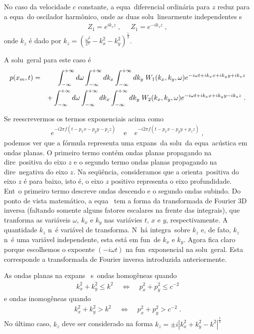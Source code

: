 No caso da velocidade $c$ constante, a equa\cao\ diferencial ordin\'aria
para $z$ reduz para a equa\cao\ do oscilador harm\^onico, onde as
duas solu\coes\ linearmente independentes s\ao\
\begin{eqnarray}
Z_1 = e^{ik_z z} \;, \;\;\;\;\; Z_1 = e^{-ik_z z} \; ,
\end{eqnarray}
onde $k_z$ \'e dado por $k_z = (\frac{\omega^2}{c^2} - k_x^2
- k_y^2)^{\frac{1}{2}}$.

A solu\cao\ geral para este caso \'e
\begin{eqnarray}\label{solcconst}
p(x_m,t) &=& \int_{-\infty}^{+\infty} d\omega \int_{-\infty}^{+\infty} dk_x \int_{-\infty}^{+\infty} dk_y \; W_1(k_x,k_y,\omega)
e^{-i\omega t + ik_x x + ik_y y + ik_z z} \nonumber \\
& & + \int_{-\infty}^{+\infty} d\omega \int_{-\infty}^{+\infty} dk_x \int_{-\infty}^{+\infty} dk_y \; W_2(k_x,k_y,\omega) 
e^{-i\omega t + ik_x x + ik_y y - ik_z z} \; .
\end{eqnarray}

Se reescrevermos os termos exponenciais acima como
\begin{eqnarray}
e^{-i2\pi f (t - p_x x - p_y y - p_z z)} \;\;\;\; \mbox{e} \;\;\;\;
e^{-i2\pi f (t - p_x x - p_y y + p_z z)} \; ,
\end{eqnarray} 
podemos ver que a f\'ormula  representa uma expans\ao\
da solu\cao\ da equa\cao\ ac\'ustica em ondas planas. O primeiro termo
cont\'em ondas planas propagando na dire\cao\ positiva do eixo $z$ e o
segundo termo ondas planas propagando na dire\cao\ negativa do
eixo $z$. Na seq\"u\^encia, consideramos que a orienta\cao\ positiva do
eixo $z$ \'e para baixo, isto \'e, o eixo $z$ positivo representa o 
eixo profundidade. Ent\ao\ o primeiro termo descreve ondas descendo e
o segundo ondas subindo. Do ponto de vista matem\'atico, a equa\cao\
 tem a forma da transformada de Fourier 3D inversa
(faltando somente alguns fatores escalares na frente das integrais), que
tranforma as vari\'aveis $\omega$, $k_x$ e $k_y$ nas vari\'avies $t$,
$x$ e $y$, respectivamente. A quantidade $k_z$ n\ao\ \'e vari\'avel de
transforma\cao. N\ao\ h\'a integra\cao\ sobre $k_z$ e, de fato, $k_z$
n\ao\ \'e uma vari\'avel independente, esta est\'a em fun\cao\ de
$k_x$ e $k_y$. Agora fica claro porque escolhemos o expoente
$(-i\omega t)$ na fun\cao\ exponencial na solu\cao\ geral. Esta
corresponde a transformada de Fourier inversa introduzida
anteriormente.

As ondas planas na expans\ao\ \refi{solcconst} s\ao\ ondas homog\^eneas
quando
\begin{eqnarray}
k_x^2 + k_y^2 \leq k^2 \;\;\;\; \Longleftrightarrow \;\;\;\;
p_x^2 + p_y^2 \leq c^{-2}
\end{eqnarray}
e ondas inomog\^eneas quando
\begin{eqnarray}
k_x^2 + k_y^2 > k^2 \;\;\;\; \Longleftrightarrow \;\;\;\;
p_x^2 + p_y^2 > c^{-2} \; .
\end{eqnarray}
No \'ultimo caso, $k_z$ deve ser considerado na forma $k_z =
\pm i|k_x^2 + k_y^2 - k^2|^{\frac{1}{2}}$

